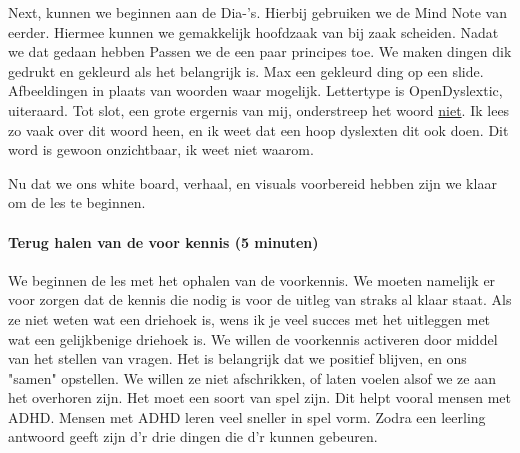 \documentclass{article}
\begin{document}
                    Next, kunnen we beginnen aan de Dia-'s. Hierbij gebruiken we de Mind Note van eerder. Hiermee kunnen we gemakkelijk hoofdzaak van bij zaak scheiden. Nadat we dat gedaan hebben Passen we de een paar principes toe. We maken dingen dik gedrukt en gekleurd als het belangrijk is. Max een gekleurd ding op een slide. Afbeeldingen in plaats van woorden waar mogelijk. Lettertype is OpenDyslextic, uiteraard. Tot slot, een grote ergernis van mij, onderstreep het woord \underline{niet}. Ik lees zo vaak over dit woord heen, en ik weet dat een hoop dyslexten dit ook doen. Dit word is gewoon onzichtbaar, ik weet niet waarom.

                    Nu dat we ons white board, verhaal, en visuals voorbereid hebben zijn we klaar om de les te beginnen.
                
                \bigskip\noindent\paragraph{Terug halen van de voor kennis (5 minuten)}
                    
                    We beginnen de les met het ophalen van de voorkennis. We moeten namelijk er voor zorgen dat de kennis die nodig is voor de uitleg van straks al klaar staat. Als ze niet weten wat een driehoek is, wens ik je veel succes met het uitleggen met wat een gelijkbenige driehoek is. We willen de voorkennis activeren door middel van het stellen van vragen. Het is belangrijk dat we positief blijven, en ons "samen" opstellen\cite{samen-boven-leads-to-better-results}. We willen ze niet afschrikken, of laten voelen alsof we ze aan het overhoren zijn. Het moet een soort van spel zijn. Dit helpt vooral mensen met ADHD. Mensen met ADHD leren veel sneller in spel vorm.\cite{ADHD-en-games} Zodra een leerling antwoord geeft zijn d'r drie dingen die d'r kunnen gebeuren.
                    
\end{document}
